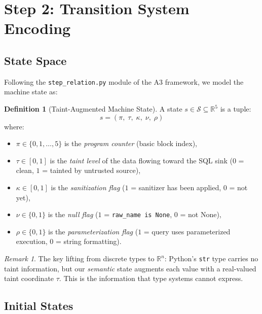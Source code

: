 \documentclass[11pt,a4paper]{article}
\theoremstyle{plain}
\theoremstyle{definition}
\newtheorem{definition}[theorem]{Definition}
\theoremstyle{remark}
\newtheorem{remark}[theorem]{Remark}
\newcommand{\R}{\mathbb{R}}
\newcommand{\StateSpace}{\mathcal{S}}
\begin{document}
\section{Step 2: Transition System Encoding}
\label{sec:transition}

\subsection{State Space}

Following the \texttt{step\_relation.py} module of the A3 framework,
we model the machine state as:

\begin{definition}[Taint-Augmented Machine State]
A state $s \in \StateSpace \subseteq \R^5$ is a tuple:
\[
  s = (\pi,\; \tau,\; \kappa,\; \nu,\; \rho)
\]
where:
\begin{itemize}[nosep]
  \item $\pi \in \{0,1,\ldots,5\}$ is the \emph{program counter}
    (basic block index),
  \item $\tau \in [0,1]$ is the \emph{taint level} of the data
    flowing toward the SQL sink
    ($0$ = clean, $1$ = tainted by untrusted source),
  \item $\kappa \in [0,1]$ is the \emph{sanitization flag}
    ($1$ = sanitizer has been applied, $0$ = not yet),
  \item $\nu \in \{0,1\}$ is the \emph{null flag}
    ($1$ = \texttt{raw\_name is None}, $0$ = not None),
  \item $\rho \in \{0,1\}$ is the \emph{parameterization flag}
    ($1$ = query uses parameterized execution, $0$ = string formatting).
\end{itemize}
\end{definition}

\begin{remark}
The key lifting from discrete types to $\R^n$:  Python's \texttt{str}
type carries no taint information, but our \emph{semantic} state
augments each value with a real-valued taint coordinate $\tau$.  This
is the information that type systems cannot express.
\end{remark}

\subsection{Initial States}
\end{document}
